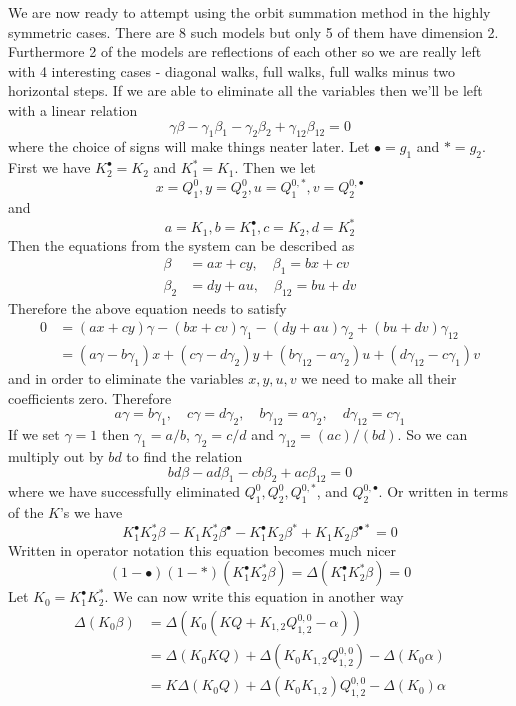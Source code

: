 We are now ready to attempt using the orbit summation method in the highly symmetric cases. There are 8 such models but only 5 of them have dimension 2. Furthermore 2 of the models are reflections of each other so we are really left with 4 interesting cases - diagonal walks, full walks, full walks minus two horizontal steps. If we are able to eliminate all the variables then we'll be left with a linear relation
\[
	\gamma \beta- \gamma_1 \beta_1-\gamma_2 \beta_2 + \gamma_{12}\beta_{12} = 0
\]
where the choice of signs will make things neater later. Let $\bullet = g_1$ and $\ast = g_2$. First we have $K_2^\bullet = K_2$ and $K_1^\ast = K_1$. Then we let
\[
	x = Q_1^0, y= Q_2^0, u= Q_1^{0,\ast}, v = Q_2^{0,\bullet}
\]
and
\[
	a = K_1, b = K_1^\bullet,c=K_2,d = K_2^\ast
\]
Then the equations from the system can be described as
\begin{align*}
	\beta &= a x + c y,\quad \beta_1 = b x + c v\\
	\beta_2 &= d y + a u,\quad \beta_{12} = b u + d v
\end{align*}
Therefore the above equation needs to satisfy
\begin{align*}
	0 &= (ax+cy)\gamma - (bx+cv)\gamma_1 - (dy+au)\gamma_2 + (bu +dv) \gamma_{12}\\
	   &= (a\gamma-b\gamma_1)x + (c\gamma-d\gamma_2)y + (b\gamma_{12}-a\gamma_2)u + (d\gamma_{12}-c\gamma_1)v
\end{align*}
and in order to eliminate the variables $x,y,u,v$ we need to make all their coefficients zero. Therefore
\[
	a\gamma = b\gamma_1,\quad c\gamma = d\gamma_2, \quad b\gamma_{12} = a \gamma_2,\quad d\gamma_{12} = c\gamma_1
\]
If we set $\gamma = 1$ then $\gamma_1 = a/b$, $\gamma_2 = c/d$ and $\gamma_{12} = (ac)/(bd)$. So we can multiply out by $bd$ to find the relation
\[
	bd\beta-ad\beta_1-cb \beta_2+ac \beta_{12} = 0
\]
where we have successfully eliminated $Q_1^0, Q_2^0, Q_1^{0,\ast}$, and $  Q_2^{0,\bullet}$. Or written in terms of the $K$'s we have
\[
	K_1^{\bullet}K_2^{\ast}\beta^{}-K_1^{}K_2^{\ast}\beta^{\bullet}-K_1^{\bullet}K_2^{}\beta^{\ast}+K_1^{}K_2^{}\beta^{\bullet\ast} = 0
\]
Written in operator notation this equation becomes much nicer
\[
	(1-\bullet)(1-\ast)(K_1^\bullet K_2^\ast \beta) = \Delta(K_1^\bullet K_2^\ast \beta) = 0
\]
Let $K_0 = K_1^\bullet K_2^\ast$. We can now write this equation in another way
\begin{align*}
	\Delta(K_0\beta) &= \Delta(K_0(KQ + K_{1,2}Q_{1,2}^{0,0} - \alpha)) \\
	&= \Delta(K_0 KQ) +\Delta(K_0 K_{1,2}Q_{1,2}^{0,0}) - \Delta(K_0\alpha)\\
	&= K\Delta(K_0 Q) + \Delta(K_0 K_{1,2})Q_{1,2}^{0,0} - \Delta(K_0)\alpha
\end{align*}
